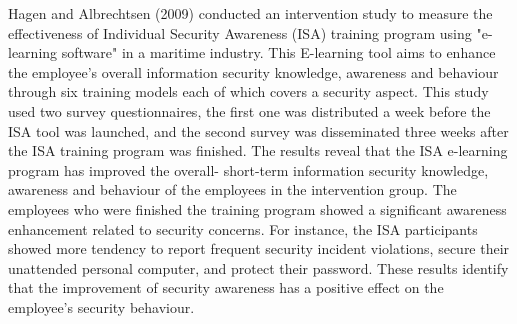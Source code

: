 Hagen and Albrechtsen (2009) conducted an intervention study to measure the effectiveness of Individual Security  Awareness (ISA) training program using "e-learning software" in a maritime industry. This E-learning tool aims to enhance the employee's overall information security knowledge, awareness and behaviour through six training models each of which covers a security aspect. This study used two survey questionnaires, the first one was distributed a week before the ISA tool was launched, and the second survey was disseminated three weeks after the ISA training program was finished. The results reveal that the ISA e-learning program has improved the overall- short-term information security knowledge, awareness and behaviour of the employees in the intervention group. The employees who were finished the training program showed a significant awareness enhancement related to security concerns. For instance, the ISA participants showed more tendency to report frequent security incident violations, secure their unattended personal computer, and protect their password. These results identify that the improvement of security awareness has a positive effect on the employee's security behaviour.

